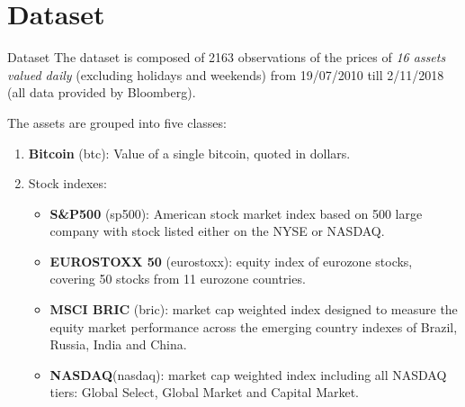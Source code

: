 \documentclass[c, 10pt]{beamer}
\begin{document}
\section{Dataset}

\begin{frame}[allowframebreaks]{Dataset}
\bigskip
The dataset is composed of 2163 observations of the prices of \textit{16 assets valued daily} (excluding holidays and weekends) from 19/07/2010 till 2/11/2018 (all data provided by Bloomberg).

The assets are grouped into five classes:

\begin{enumerate}
	\item \textbf{Bitcoin} (btc): Value of a single bitcoin, quoted in dollars.

	\item Stock indexes:
	\begin{itemize}
		\item \textbf{S\&P500} (sp500): American stock market index based on 500 large company with stock listed either on the NYSE or NASDAQ.
		\item \textbf{EUROSTOXX 50} (eurostoxx): equity index of eurozone stocks, covering 50 stocks from 11 eurozone countries.
		\item \textbf{MSCI BRIC} (bric): market cap weighted index designed to measure the equity market performance across the emerging country indexes of Brazil, Russia, India and China.
		\item \textbf{NASDAQ}(nasdaq): market cap weighted index including all NASDAQ tiers: Global Select, Global Market and Capital Market.
	\end{itemize}
	
	\framebreak
	

\end{enumerate}
\end{frame}
\end{document}
